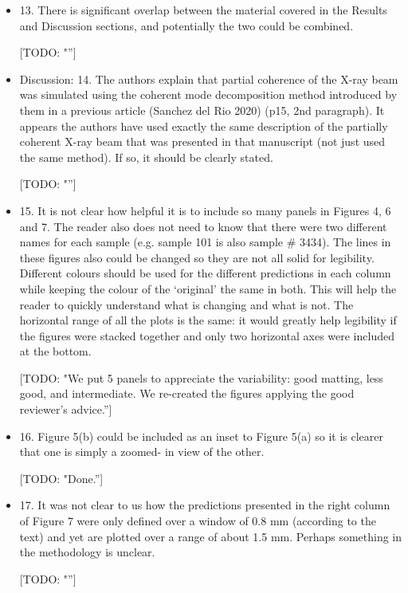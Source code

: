 \documentclass[11pt]{letter} %
\newcommand{\todo}[1]{{\color{red}[TODO: "#1'']}}
\begin{document}
\begin{letter}{}
\begin{itemize}
    \todo{}
    
    \item 13. There is significant overlap between the material covered in the Results and Discussion sections, and potentially the two could be combined.
    
    \todo{}
    
    \item Discussion: 14. The authors explain that partial coherence of the X-ray beam was simulated using the coherent mode decomposition method introduced by them in a previous article (Sanchez del Rio 2020) (p15, 2nd paragraph). It appears the authors have used exactly the same description of the partially coherent X-ray beam that was presented in that manuscript (not just used the same method). If so, it should be clearly stated.
    
    \todo{}
    
    \item 15. It is not clear how helpful it is to include so many panels in Figures 4, 6 and 7. The reader also does not need to know that there were two different names for each sample (e.g. sample 101 is also sample \# 3434). The lines in these figures also could be changed so they are not all solid for legibility. Different colours should be used for the different predictions in each column while keeping the colour of the ‘original’ the same in both. This will help the reader to quickly understand what is changing and what is not. The horizontal range of all the plots is the same: it would greatly help legibility if the figures were stacked together and only two horizontal axes were included at the bottom.
    
    \todo{We put 5 panels to appreciate the variability: good matting, less good, and intermediate. We re-created the figures applying the good reviewer's advice.}
    
    \item 16. Figure 5(b) could be included as an inset to Figure 5(a) so it is clearer that one is simply a zoomed- in view of the other.
    
    \todo{Done.}
    
    \item 17. It was not clear to us how the predictions presented in the right column of Figure 7 were only defined over a window of 0.8 mm (according to the text) and yet are plotted over a range of about 1.5 mm. Perhaps something in the methodology is unclear.
    
    \todo{}
    

\end{itemize}
\end{letter}
\end{document}
